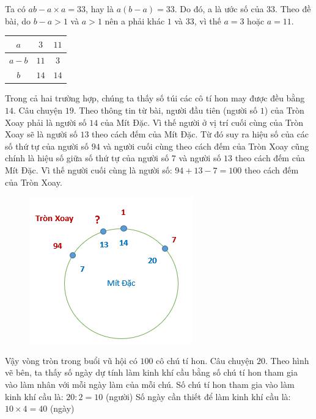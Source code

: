 \vskip 0.1cm
Ta có $ab - a\times a =33$, hay là $a(b-a) = 33$. Do đó, a là ước số của $33$. Theo đề bài, do $b - a > 1$ và $a>1$ nên a phải khác $1$ và $33$, vì thế $a=3$ hoặc $a= 11$.
\begin{table}[H]
	\centering
	\renewcommand{\arraystretch}{1.3}
	\begin{tabular}{|c|c|c|}
		\hline
		$a$ & $3$ & $11$\\
		\hline
		$a-b$& $11$ & $3$\\
		\hline
		$b$ & $14$ & $14$\\
		\hline
	\end{tabular}
\end{table}
Trong cả hai trường hợp, chúng ta thấy số túi các cô tí hon may được đều bằng $14$.
\vskip 0.1cm
Câu chuyện $19$.
\vskip 0.1cm
Theo thông tin từ bài, người đầu tiên (người số $1$) của Tròn Xoay phải là người số $14$ của Mít Đặc. Vì thế người ở vị trí cuối cùng của Tròn Xoay sẽ là người số $13$ theo cách đếm của Mít Đặc. Từ đó suy ra hiệu số của các số thứ tự của người số $94$ và người cuối cùng theo cách đếm của Tròn Xoay cũng chính là hiệu số giữa số thứ tự của người số $7$ và người số $13$  theo cách đếm của Mít Đặc. Vì thế người cuối cùng là người số: $94+ 13-7=100$ theo cách đếm của Tròn Xoay.
\begin{figure}[H]
	\centering
	\vspace*{-5pt}
	\captionsetup{labelformat= empty, justification=centering}
	\includegraphics[width=0.45\linewidth]{15}
	\vspace*{-15pt}
\end{figure}
Vậy vòng tròn trong buổi vũ hội có $100$ cô chú tí hon.
\vskip 0.1cm
Câu chuyện $20.$ 
\vskip 0.1cm
Theo hình vẽ bên, ta thấy số ngày dự tính làm kinh khí cầu bằng số chú tí hon tham gia vào làm nhân với mỗi ngày làm của mỗi chú.
Số chú tí hon tham gia vào làm kinh khí cầu là: $20 : 2 = 10$ (người)
\vskip 0.1cm
Số ngày cần thiết để làm kinh khí cầu là: $10 \times 4 = 40$ (ngày)
